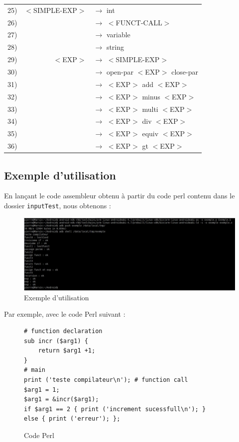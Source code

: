 \documentclass[a4paper,10pt]{article}
\begin{document}
\begin{tabular}{rrl}
25)&$<$SIMPLE-EXP$>$	& $\rightarrow$ int \\
26)&					& $\rightarrow$ $<$FUNCT-CALL$>$ \\
27)&					& $\rightarrow$ variable \\
28)&					& $\rightarrow$ string \\

29)&$<$EXP$>$			& $\rightarrow$ $<$SIMPLE-EXP$>$   \\
30)&					& $\rightarrow$ open-par $<$EXP$>$ close-par\\ 
31)&					& $\rightarrow$ $<$EXP$>$ add $<$EXP$>$ \\
32)&					& $\rightarrow$ $<$EXP$>$ minus $<$EXP$>$ \\
33)&					& $\rightarrow$ $<$EXP$>$ multi $<$EXP$>$ \\
34)&					& $\rightarrow$ $<$EXP$>$ div $<$EXP$>$ \\
35)&					& $\rightarrow$ $<$EXP$>$ equiv $<$EXP$>$ \\
36)&					& $\rightarrow$ $<$EXP$>$ gt $<$EXP$>$ \\
\end{tabular}

\subsection{Exemple d'utilisation}
En lançant le code assembleur obtenu à partir du code perl contenu dans le dossier \verb?inputTest?, nous obtenons : 
 \begin{figure}[H] \hspace*{-2cm} 
   \centering
   	  \includegraphics[width=375pt]{exemple.jpg} 
			\caption{Exemple d'utilisation}
			\label{ExempleUtilisation}
 \end{figure}
 Par exemple, avec le code Perl suivant :
 ~\\
 \begin{figure}[H]
\begin{lstlisting}
# function declaration
sub incr ($arg1) {
	return $arg1 +1;
}
# main
print ('teste compilateur\n'); # function call
$arg1 = 1;
$arg1 = &incr($arg1);
if $arg1 == 2 { print ('increment sucessfull\n'); } 
else { print ('erreur'); };	
\end{lstlisting}
\fontfamily{}
\caption{Code Perl}
\label{lst:exemple_perl}
\end{figure}
\end{document}
